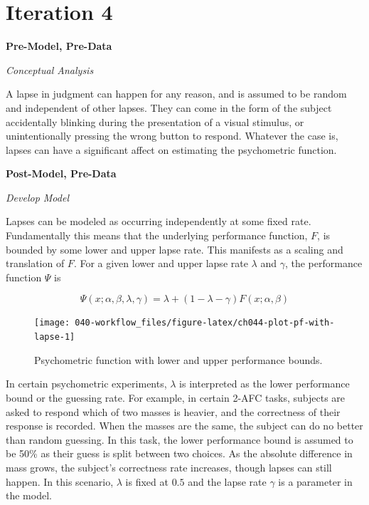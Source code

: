 \documentclass[11pt, oneside, openany]{scrbook}
\begin{document}
\hypertarget{iter4}{%
\section{Iteration 4}\label{iter4}}

\textbf{Pre-Model, Pre-Data}

\emph{Conceptual Analysis}

A lapse in judgment can happen for any reason, and is assumed to be random and independent of other lapses. They can come in the form of the subject accidentally blinking during the presentation of a visual stimulus, or unintentionally pressing the wrong button to respond. Whatever the case is, lapses can have a significant affect on estimating the psychometric function.

\textbf{Post-Model, Pre-Data}

\emph{Develop Model}

Lapses can be modeled as occurring independently at some fixed rate. Fundamentally this means that the underlying performance function, \(F\), is bounded by some lower and upper lapse rate. This manifests as a scaling and translation of \(F\). For a given lower and upper lapse rate \(\lambda\) and \(\gamma\), the performance function \(\Psi\) is

\[
\Psi(x; \alpha, \beta, \lambda, \gamma) = \lambda + (1 - \lambda - \gamma) F(x; \alpha, \beta)
\]

\begin{figure}

{\centering \texttt{[image: 040-workflow\_files/figure-latex/ch044-plot-pf-with-lapse-1]} 

}

\caption{Psychometric function with lower and upper performance bounds.}\label{fig:ch044-plot-pf-with-lapse}
\end{figure}

In certain psychometric experiments, \(\lambda\) is interpreted as the lower performance bound or the guessing rate. For example, in certain 2-AFC tasks, subjects are asked to respond which of two masses is heavier, and the correctness of their response is recorded. When the masses are the same, the subject can do no better than random guessing. In this task, the lower performance bound is assumed to be 50\% as their guess is split between two choices. As the absolute difference in mass grows, the subject's correctness rate increases, though lapses can still happen. In this scenario, \(\lambda\) is fixed at \(0.5\) and the lapse rate \(\gamma\) is a parameter in the model.
\end{document}
